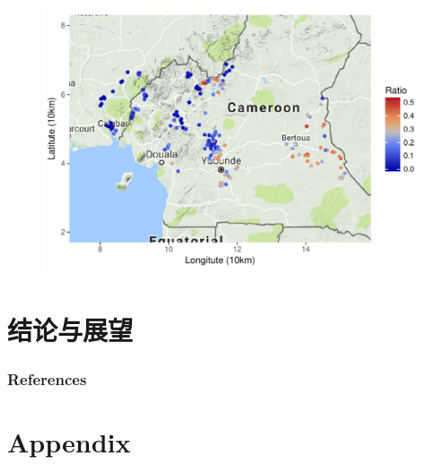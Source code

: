 \documentclass[11pt,compress,xcolor=x11names,UTF8]{beamer}
\begin{document}
\begin{frame}
\begin{figure}
\centering
\includegraphics[width=\textwidth]{demo03} %
\end{figure}
\end{frame}



\section{结论与展望}

\begin{frame}

\end{frame}



\begin{frame}[allowframebreaks]
\frametitle{References}
\scriptsize


\end{frame}

\appendix

\section*{Appendix}
\end{document}
